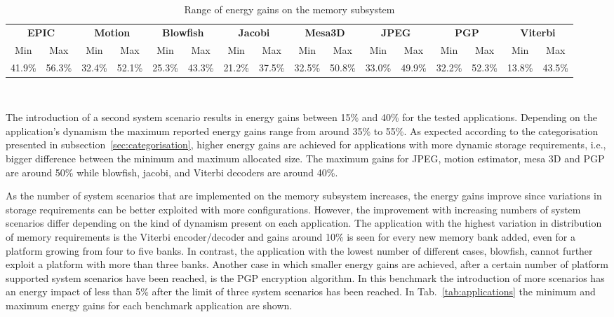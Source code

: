\documentclass{acm_proc_article-sp}
\begin{document}
\begin{center}
	\begin{table*}[!t]
	\caption{Range of energy gains on the memory subsystem}
	\label{tab:ranges}
	{\small
	\hfill{}
	\begin{tabular}{|c|c|c|c|c|c|c|c|c|c|c|c|c|c|c|c|}
		\hline
		\multicolumn{2}{|c|}{\textbf{EPIC}} &
		\multicolumn{2}{c|}{\textbf{Motion}} &
		\multicolumn{2}{c|}{\textbf{Blowfish}} &
		\multicolumn{2}{c|}{\textbf{Jacobi}} &
		\multicolumn{2}{c|}{\textbf{Mesa3D}} &
		\multicolumn{2}{c|}{\textbf{JPEG}} &
		\multicolumn{2}{c|}{\textbf{PGP}} &
		\multicolumn{2}{c|}{\textbf{Viterbi}} \\ 
		\cline{1-16}
		Min & Max & Min & Max & Min & Max & 
		Min & Max & Min & Max & Min & Max & 
		Min & Max & Min & Max\\ 
		\hline 
		41.9\% & 56.3\% & 32.4\% & 52.1\% & 25.3\% & 43.3\% & 
		21.2\% & 37.5\% & 32.5\% & 50.8\% & 33.0\% & 49.9\% & 
		32.2\% & 52.3\% & 13.8\% & 43.5\% \\ 
		\hline 
	\end{tabular}}
	\hfill{}
	\\
	\end{table*}
\end{center}

The introduction of a second system scenario results in energy gains between 15\% and  40\%  for the tested applications. Depending on the application's dynamism the maximum reported energy gains range from around 35\% to 55\%. As expected according to the categorisation presented in subsection~\ref{sec:categorisation}, higher energy gains are achieved for applications with more dynamic storage requirements, i.e., bigger difference between the minimum and maximum allocated size. The maximum gains for JPEG, motion estimator, mesa 3D and PGP are around 50\% while blowfish, jacobi, and Viterbi decoders are around 40\%.

As the number of system scenarios that are implemented on the memory subsystem increases, the energy gains improve since variations in storage requirements can be better exploited with more configurations. However, the improvement with increasing numbers of system scenarios differ depending on the kind of dynamism present on each application. The application with the highest variation in distribution of memory requirements is the Viterbi encoder/decoder and gains around 10\% is seen for every new memory bank added, even for a platform growing from four to five banks. In contrast, the application with the lowest number of different cases, blowfish, cannot further exploit a platform with more than three banks. Another case in which smaller energy gains are achieved, after a certain number of platform supported system scenarios have been reached, is the PGP encryption algorithm. In this benchmark the introduction of more scenarios has an energy impact of less than 5\% after the limit of three system scenarios has been reached. In Tab.~\ref{tab:applications} the minimum and maximum energy gains for each benchmark application are shown.
\end{document}
